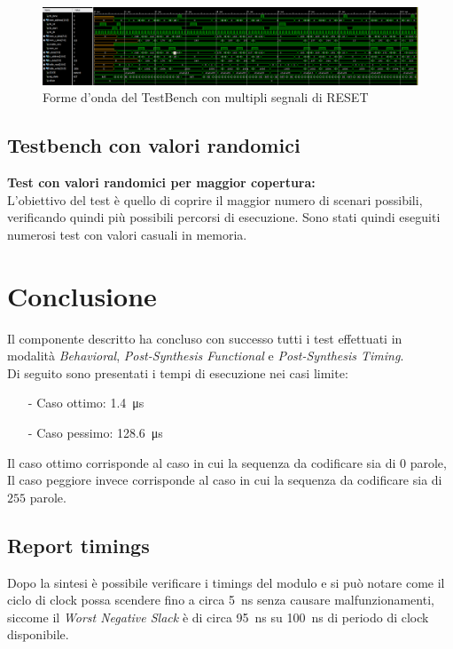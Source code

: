 \documentclass{article}
\begin{document}
\begin{figure}[H]
\centerline{\includegraphics[scale=0.35]{tb_reset_multipli.PNG}}
\centering
\caption{Forme d'onda del TestBench con multipli segnali di RESET}
\centering
\end{figure}

\subsection{Testbench con valori randomici}
\textbf{Test con valori randomici per maggior copertura:}\\
L'obiettivo del test è quello di coprire il maggior numero di scenari possibili, verificando quindi più possibili percorsi di esecuzione. Sono stati quindi eseguiti numerosi test con valori casuali in memoria. 


\section{Conclusione}
Il componente descritto ha concluso con successo tutti i test effettuati in modalità \textit{Behavioral}, \textit{Post-Synthesis Functional} e \textit{Post-Synthesis Timing}.\\
Di seguito sono presentati i tempi di esecuzione nei casi limite:
\begin{itemize}
    \item[-] Caso ottimo: \SI{1,4}{\micro\second}
    \item[-] Caso pessimo: \SI{128,6}{\micro\second}
\end{itemize}
Il caso ottimo corrisponde al caso in cui la sequenza da codificare sia di $0$ parole, Il caso peggiore invece corrisponde al caso in cui la sequenza da codificare sia di $255$ parole.

\subsection{Report timings}
Dopo la sintesi è possibile verificare i timings del modulo e si può notare come il ciclo di clock possa scendere fino a circa \SI{5}{\nano\second} senza causare malfunzionamenti, siccome il \textit{Worst Negative Slack} è di circa \SI{95}{\nano\second} su \SI{100}{\nano\second} di periodo di clock disponibile.
\end{document}
